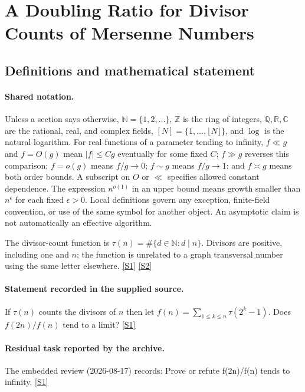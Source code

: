 \documentclass[11pt,a4paper]{article}
\newcommand{\N}{\mathbb{N}}
\newcommand{\Z}{\mathbb{Z}}
\newcommand{\Q}{\mathbb{Q}}
\newcommand{\R}{\mathbb{R}}
\newcommand{\C}{\mathbb{C}}
\newcommand{\sref}[2]{\hyperlink{source:#1:#2}{[S#2]}}
\begin{document}
\section{A Doubling Ratio for Divisor Counts of Mersenne Numbers}\label{statement}


\subsection{Definitions and mathematical statement}

\paragraph{Shared notation.}Unless a section says otherwise, $\N=\{1,2,\ldots\}$,
$\Z$ is the ring of integers, $\Q,\R,\C$ are the rational, real, and complex
fields, $[N]=\{1,\ldots,\lfloor N\rfloor\}$, and $\log$ is the natural
logarithm. For real functions of a parameter tending to infinity,
$f\ll g$ and $f=O(g)$ mean $|f|\leq Cg$ eventually for some fixed $C$;
$f\gg g$ reverses this comparison; $f=o(g)$ means $f/g\to0$;
$f\sim g$ means $f/g\to1$; and $f\asymp g$ means both order bounds.
A subscript on $O$ or $\ll$ specifies allowed constant dependence.
The expression $n^{o(1)}$ in an upper bound means growth smaller than
$n^\epsilon$ for each fixed $\epsilon>0$. Local definitions govern any
exception, finite-field convention, or use of the same symbol for another
object. An asymptotic claim is not automatically an effective algorithm.



The divisor-count function is $\tau(n)=\#\{d\in\N:d\mid n\}$. Divisors are positive, including one and $n$; the function is unrelated to a graph transversal number using the same letter elsewhere. \sref{statement}{1} \sref{statement}{2}

\paragraph{Statement recorded in the supplied source.}
If $\tau(n)$ counts the divisors of $n$ then let $ f(n)=\sum_{1\leq k\leq n}\tau(2^k-1). $ Does $f(2n)/f(n)$ tend to a limit? \sref{statement}{1}

\paragraph{Residual task reported by the archive.}

The embedded review (2026-08-17) records: Prove or refute f(2n)/f(n) tends to infinity. \sref{statement}{1}
\end{document}
